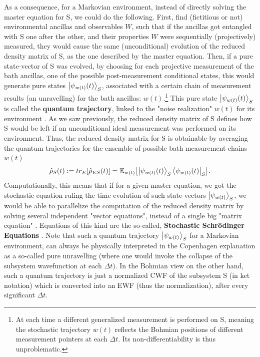 \documentclass[11pt, a4paper]{article} %
\begin{document}
As a consequence, for a Markovian environment, instead of directly solving the master equation for S, we could do the following. First, find (fictitious or not) environmental ancillas and observables $W$, such that if the ancillas got entangled with S one after the other, and their properties $W$ were sequentially (projectively) measured, they would cause the same (unconditional) evolution of the reduced density matrix of S, as the one described by the master equation. Then, if a pure state-vector of S was evolved, by choosing for each projective measurement of the bath ancillas, one of the possible post-measurement conditional states, this would generate pure states $\ket{\psi_{w(t)}(t)}_S$, associated with a certain chain of measurement results (an unravelling) for the bath ancillas: $w(t)$.\footnote{At each time a different generalized measurement is performed on S, meaning the stochastic trajectory $w(t)$ reflects the Bohmian positions of different measurement pointers at each $\Delta t$. Its non-differentiability is thus unproblematic.} This pure state $\ket{\psi_{w(t)}(t)}_S$ is called the {\bf quantum trajectory}, linked to the "noise realization" $w(t)$ for its environment \cite{Generalized, MarkovianityDefs, QuantumTrajs}. As we saw previously, the reduced density matrix of S defines how S would be left if an unconditional ideal measurement was performed on its environment. Thus, the reduced density matrix for S is obtainable by averaging the quantum trajectories for the ensemble of possible bath measurement chains $w(t)$ \cite{MarkovianityDefs,QuantumTrajs}\vspace{-0.21cm}
\begin{equation}
\hat{\rho}_S(t):=tr_{E}[\hat{\rho}_{ES}(t)]=\mathbb{E}_{w(t)}\qty[\ket{\psi_{w(t)}(t)}_S\bra{\psi_{w(t)}(t)}_S]. \vspace{-0.12cm}
\end{equation}
Computationally, this means that if for a given master equation, we got the stochastic equation ruling the time evolution of such state-vectors $\ket{\psi_{w(t)}}_S$, we would be able to parallelize the computation of the reduced density matrix by solving several independent "vector equations", instead of a single big "matrix equation" \cite{MarkovianityDefs, QuantumTrajs}. Equations of this kind are the so-called, {\bf Stochastic Schrödinger Equations} \cite{Generalized, continousMeas}. Note that such a quantum trajectory $\ket{\psi_{w(t)}}_S$ for a Markovian environment, can always be physically interpreted in the Copenhagen explanation as a so-called pure unravelling \cite{MarkovianityDefs} (where one would invoke the collapse of the subsystem wavefunction at each $\Delta t$). In the Bohmian view on the other hand, such a quantum trajectory is just a normalized CWF of the subsystem S (in ket notation) which is converted into an EWF (thus the normalization), after every significant $\Delta t$.\vspace{-0.05cm}
 
\end{document}
